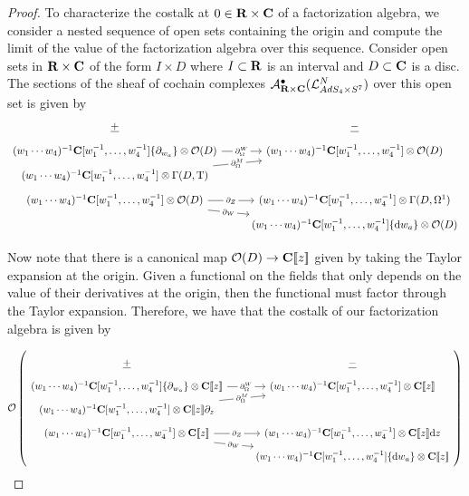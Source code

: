 \documentclass[../main.tex]{subfiles}
\begin{document}
\begin{proof}
To characterize the costalk at $0 \in \mathbf{R} \times \mathbf{C}$ of a factorization algebra, we consider a nested sequence of open sets containing the origin and compute the limit of the value of the factorization algebra over this sequence. Consider open sets in $\mathbf{R}\times \mathbf{C}$ of the form $I\times D$ where $I\subset \mathbf{R}$ is an interval and $D\subset \mathbf{C}$ is a disc. The sections of the sheaf of cochain complexes $\mathcal A^\bullet_{\mathbf{R} \times \mathbf{C}}(\mathcal{L}^N_{AdS_4\times S^7} ) $ over this open set is given by \begin{equation}
\begin{tikzcd}[row sep = 1 ex]
    \ul{+} & \ul{-} \\
(w_1\cdots w_4)^{-1} \C[w_1^{-1},\ldots, w_4^{-1}] \{\partial_{w_a}\} \otimes \mc{O}(D)\ar[r, "\del^W_\Omega" description] & (w_1\cdots w_4)^{-1} \C[w_1^{-1},\ldots, w_4^{-1}]  \otimes \mc O(D) \\
(w_1\cdots w_4)^{-1} \C[w_1^{-1},\ldots, w_4^{-1}]   \otimes \Gamma (D, \T)\ar[ur, "\del^M_\Omega" description] \\
(w_1\cdots w_4)^{-1} \C[w_1^{-1},\ldots, w_4^{-1}] \otimes \mc{O}(D)\ar[r, "\del_Z" description]\ar[dr, "\del_W" description] & (w_1\cdots w_4)^{-1} \C[w_1^{-1},\ldots, w_4^{-1}] \otimes \Gamma (D, \Omega^1) \\ & (w_1\cdots w_4)^{-1} \C[w_1^{-1},\ldots, w_4^{-1}] \{\d w_a\}  \otimes \mc O(D)
\end{tikzcd}
\end{equation}

Now note that there is a canonical map $\mathcal{O}(D) \to \mathbf{C}[\![z]\!] $ given by taking the Taylor expansion at the origin. Given a functional on the fields that only depends on the value of their derivatives at the origin, then the functional must factor through the Taylor expansion. Therefore, we have that the costalk of our factorization algebra is given by 

\begin{equation}
\cO\left (\begin{tikzcd}[row sep = 1 ex]
        \ul{+} & \ul{-} \\ 
(w_1\cdots w_4)^{-1} \C[w_1^{-1},\ldots, w_4^{-1}] \{\partial_{w_a}\} \otimes \C[\![z]\!] \ar[r, "\del^W_\Omega" description] & (w_1\cdots w_4)^{-1} \C[w_1^{-1},\ldots, w_4^{-1}]  \otimes \C[\![z]\!] \\
(w_1\cdots w_4)^{-1} \C[w_1^{-1},\ldots, w_4^{-1}]   \otimes \C[\![z]\!]\del_z\ar[ur, "\del^M_\Omega" description] \\
(w_1\cdots w_4)^{-1} \C[w_1^{-1},\ldots, w_4^{-1}] \otimes \C[\![z]\!]\ar[r, "\del_Z" description]\ar[dr, "\del_W" description] & (w_1\cdots w_4)^{-1} \C[w_1^{-1},\ldots, w_4^{-1}] \otimes \C[\![z]\!]\d z \\ & (w_1\cdots w_4)^{-1} \C[w_1^{-1},\ldots, w_4^{-1}] \{\d w_a\}  \otimes \C[\![z]\!]
\end{tikzcd} \right )
\end{equation}


\end{proof}
\end{document}
